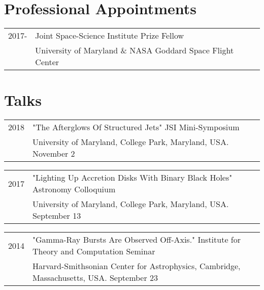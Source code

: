 \documentclass[letterpaper]{article}
\renewenvironment{itemize}{
  \begin{list}{}{
    \setlength{\leftmargin}{1.5em}
  }
}{
  \end{list}
}
\begin{document}
\section*{Professional Appointments} %
\begin{itemize}
\item \begin{tabular}{ll}
2017- & Joint Space-Science Institute Prize Fellow \\
	 & University of Maryland  \& NASA Goddard Space Flight Center\\
\end{tabular}
\end{itemize}



\section*{Talks}
\begin{itemize}
\item \begin{tabular}{ll}
2018 & "The Afterglows Of Structured Jets" JSI Mini-Symposium  \\
	& University of Maryland, College Park, Maryland, USA.  November 2
\end{tabular}

\item \begin{tabular}{ll}
2017 & "Lighting Up Accretion Disks With Binary Black Holes" Astronomy Colloquium  \\
	& University of Maryland, College Park, Maryland, USA.  September 13
\end{tabular}

\item \begin{tabular}{ll}
2014 & "Gamma-Ray Bursts Are Observed Off-Axis." Institute for Theory and Computation Seminar  \\
	& Harvard-Smithsonian Center for Astrophysics, Cambridge, Massachusetts, USA.  September 23
\end{tabular}
\end{itemize}

\end{document}
